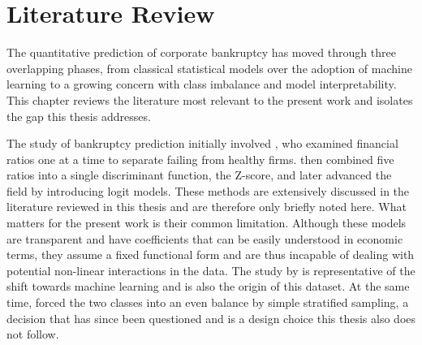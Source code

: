 \chapter{Literature Review}
\label{ch:literature}

The quantitative prediction of corporate bankruptcy has moved through three
overlapping phases, from classical statistical models over the adoption of
machine learning to a growing concern with class imbalance and model
interpretability. This chapter reviews the literature most relevant to 
the present work and isolates the gap this thesis addresses.

The study of bankruptcy prediction initially involved \textcite{beaver1966},
who examined financial ratios one at a time to separate failing from healthy
firms. \textcite{altman1968} then combined five ratios into a single
discriminant function, the Z-score, and later \textcite{ohlson1980} advanced
the field by introducing logit models. These methods are extensively discussed in the
literature reviewed in this thesis and are therefore only briefly noted here.
What matters for the present work is their common limitation. Although these
models are transparent and have coefficients that can be easily understood in
economic terms, they assume a fixed functional form and are thus incapable of
dealing with potential non-linear interactions in the data. The study by
\textcite{liang2016} is representative of the shift towards machine learning and
is also the origin of this dataset. At the same time, \textcite[562]{liang2016}
forced the two classes into an even balance by simple stratified sampling, a
decision that has since been questioned and is a design choice this 
thesis also does not follow.

